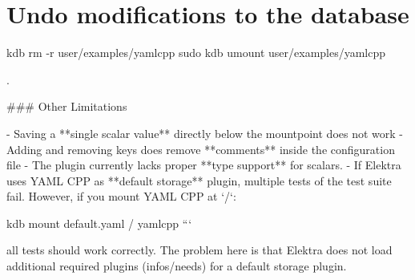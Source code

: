 \section*{Undo modifications to the database}

kdb rm -\/r user/examples/yamlcpp sudo kdb umount user/examples/yamlcpp 
\begin{DoxyCode}
.

### Other Limitations

- Saving a **single scalar value** directly below the mountpoint does not work
- Adding and removing keys does remove **comments** inside the configuration file
- The plugin currently lacks proper **type support** for scalars.
- If Elektra uses YAML CPP as **default storage** plugin, multiple tests of the test suite fail. However,
       if you mount YAML CPP at `/`:
\end{DoxyCode}
 kdb mount default.\+yaml / yamlcpp ```

all tests should work correctly. The problem here is that Elektra does not load additional required plugins ({\ttfamily infos/needs}) for a default storage plugin. 